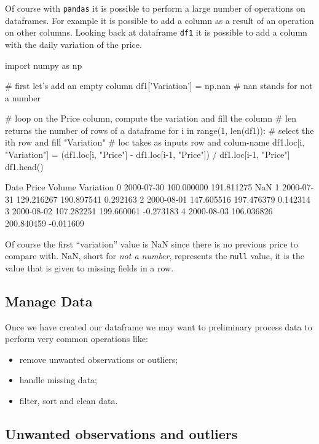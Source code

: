 Of course with \texttt{pandas} it is possible to perform a large number of operations on dataframes. 
For example it is possible to add a column as a result of an operation on other columns. 
Looking back at dataframe \texttt{df1} it is possible to add a column with the daily variation of the price.

\begin{ipython}
import numpy as np

# first let's add an empty column
df1['Variation'] = np.nan # nan stands for not a number

# loop on the Price column, compute the variation and fill the column
# len returns the number of rows of a dataframe
for i in range(1, len(df1)):
    # select the ith row and fill "Variation"
    # loc takes as inputs row and colum-name
    df1.loc[i, "Variation"] = (df1.loc[i, "Price"] - df1.loc[i-1, "Price"]) /
        df1.loc[i-1, "Price"]
df1.head()
\end{ipython}
\begin{ioutput}
        Date       Price      Volume  Variation
0 2000-07-30  100.000000  191.811275        NaN
1 2000-07-31  129.216267  190.897541   0.292163
2 2000-08-01  147.605516  197.476379   0.142314
3 2000-08-02  107.282251  199.660061  -0.273183
4 2000-08-03  106.036826  200.840459  -0.011609
\end{ioutput}
\noindent
Of course the first ``variation'' value is NaN since there is no previous price to compare with.
NaN, short for \emph{not a number}, represents the \texttt{null} value, it is the value that is 
given to missing fields in a row. 

\subsection{Manage Data}\label{manage-data}

Once we have created our dataframe we may want to preliminary process data to perform very common operations like:

\begin{itemize}
	\tightlist
\item remove unwanted observations or outliers;
\item handle missing data;
\item filter, sort and clean data.
\end{itemize}

\subsection{Unwanted observations and outliers}

